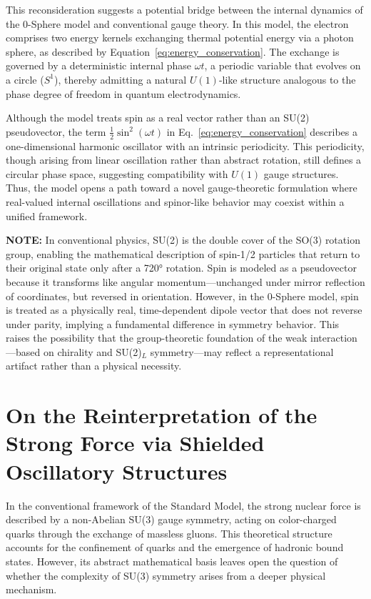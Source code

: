 \documentclass[12pt,letterpaper]{article} %
\begin{document}
This reconsideration suggests a potential bridge between the internal dynamics of the 0-Sphere model and conventional gauge theory. In this model, the electron comprises two energy kernels exchanging thermal potential energy via a photon sphere, as described by Equation~\eqref{eq:energy_conservation}. The exchange is governed by a deterministic internal phase $\omega t$, a periodic variable that evolves on a circle ($S^1$), thereby admitting a natural $U(1)$-like structure analogous to the phase degree of freedom in quantum electrodynamics.

Although the model treats spin as a real vector rather than an SU(2) pseudovector, the term $\frac{1}{2}\sin^2(\omega t)$ in Eq.~\eqref{eq:energy_conservation} describes a one-dimensional harmonic oscillator with an intrinsic periodicity. This periodicity, though arising from linear oscillation rather than abstract rotation, still defines a circular phase space, suggesting compatibility with $U(1)$ gauge structures. Thus, the model opens a path toward a novel gauge-theoretic formulation where real-valued internal oscillations and spinor-like behavior may coexist within a unified framework.


\medskip
\noindent\textbf{NOTE:} In conventional physics, SU(2) is the double cover of the SO(3) rotation group, enabling the mathematical description of spin-1/2 particles that return to their original state only after a 720° rotation. Spin is modeled as a pseudovector because it transforms like angular momentum—unchanged under mirror reflection of coordinates, but reversed in orientation. However, in the 0-Sphere model, spin is treated as a physically real, time-dependent dipole vector that does not reverse under parity, implying a fundamental difference in symmetry behavior. This raises the possibility that the group-theoretic foundation of the weak interaction—based on chirality and SU(2)$_L$ symmetry—may reflect a representational artifact rather than a physical necessity.


\section{On the Reinterpretation of the Strong Force via Shielded Oscillatory Structures}

In the conventional framework of the Standard Model, the strong nuclear force is described by a non-Abelian SU(3) gauge symmetry, acting on color-charged quarks through the exchange of massless gluons. This theoretical structure accounts for the confinement of quarks and the emergence of hadronic bound states. However, its abstract mathematical basis leaves open the question of whether the complexity of SU(3) symmetry arises from a deeper physical mechanism.
\end{document}
